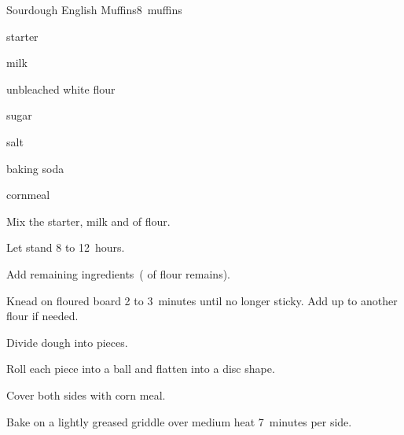 \begin{recipe}{Sourdough English Muffins}{}{8~muffins}

\begin{ingredients}
\item {} starter
\item {} milk
\item {} unbleached white flour
\item {} sugar
\item \tp{\threequarter} salt
\item \tp{\half} baking soda
\item cornmeal
\end{ingredients}

\begin{directions}
\item Mix the starter, milk and  of flour.
\item Let stand 8 to 12~hours.
\item Add remaining ingredients~( of flour remains).
\item Knead on floured board 2 to 3~minutes until no longer sticky. Add up to another \C{\quarter} flour if needed.
\item Divide dough into  pieces.
\item Roll each piece into a ball and flatten into a disc shape.
\item Cover both sides with corn meal.
\item Bake on a lightly greased griddle over medium heat 7~minutes per side.
\end{directions}

\end{recipe}
